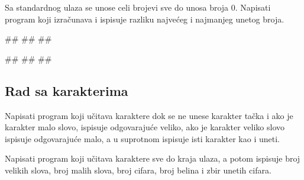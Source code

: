 \begin{Exercise}[label=p1.3_21] 
Sa standardnog ulaza se unose celi brojevi sve do unosa broja
$0$. Napisati program koji izračunava i ispisuje razliku najvećeg i
najmanjeg unetog broja. 


\begin{miditest}
\begin{upotreba}{1}
#\naslovInt#
##
##
\end{upotreba}
\end{miditest}
\begin{miditest}
\begin{upotreba}{2}
#\naslovInt#
##
##
\end{upotreba}
\end{miditest}
\end{Exercise}
\begin{Answer}[ref=p1.3_21]
\end{Answer}


\subsection{Rad sa karakterima}

\begin{Exercise}[label=v1.3_07] 
Napisati program koji učitava karaktere dok se ne unese karakter tačka
i ako je karakter malo slovo, ispisuje odgovarajuće veliko, ako je
karakter veliko slovo ispisuje odgovarajuće malo, a u suprotnom
ispisuje isti karakter kao i uneti.
\end{Exercise}
\begin{Answer}[ref=v1.3_07]
\end{Answer}

\begin{Exercise}[label=v1.3_08] 
Napisati program koji učitava karaktere sve do kraja ulaza, a
potom ispisuje broj velikih slova, broj malih slova, broj cifara, broj
belina i zbir unetih cifara.  
\end{Exercise}
\begin{Answer}[ref=v1.3_08]
\end{Answer}


